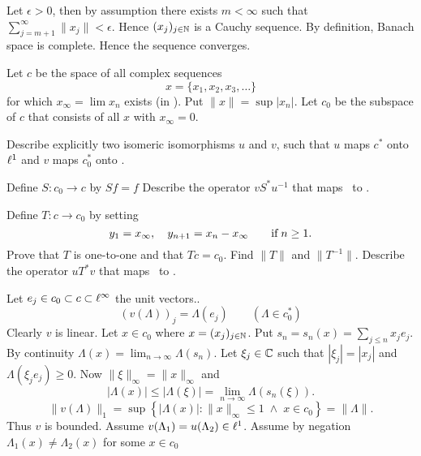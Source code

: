 \begin{enumerate}
Let \(\epsilon>0\), then by assumption there exists \(m < \infty\)
such that \(\sum_{j=m+1}^\infty \|x_j\| < \epsilon\).
Hence \((x_j)_{j\in\mathbb{N}}\) is a Cauchy sequence. By definition,
Banach space is complete. Hence the sequence converges.


\begin{excopy}
Let $c$ be the space of all complex sequences
\begin{equation*}
x = \{x_1,x_2,x_3,\ldots\}
\end{equation*}
for which \(x_\infty = \lim x_n\) exists (in \C).
 Put \(\|x\| = \sup |x_n|\). Let \(c_0\) be the subspace of $c$ that
consists of all $x$ with \(x_\infty = 0\).
\begin{itemize}

Describe explicitly two isomeric isomorphisms $u$ and $v$,
 such that $u$ maps \(c^*\) onto \(\ell^1\)
and $v$ maps \(c_0^*\) onto \ellone.

Define \(S: c_0 \to c\) by \(Sf = f\) Describe the operator
\(vS^*u^{-1}\) that maps \ellone\ to \ellone.

Define \(T: c \to c_0\) by setting
\begin{equation*}
 y_1 = x_\infty,\quad y_{n+1} = x_n - x_\infty \qquad \textnormal{if}\; n \geq 1.
\end{equation*}
Prove that $T$ is one-to-one and that \(Tc = c_0\).
 Find \(\|T\|\) and \(\|T^{-1}\|\). Describe the
operator \(uT^*v\) that maps \ellone\ to \ellone.
\end{itemize}
\end{excopy}

\begin{itemize}

Let \(e_j \in c_0 \subset c \subset \ell^\infty\) the unit vectors..
\begin{equation*}
(v(\Lambda))_j = \Lambda(e_j) \qquad (\Lambda \in c_0^*)
\end{equation*}
Clearly $v$ is linear.
Let \(x\in c_0\) where \(x=(x_j)_{j\in\mathbb{N}}\).
Put \(s_n = s_n(x) = \sum_{j\leq n} x_j e_j\).
By continuity
\(\Lambda(x) = \lim_{n\to\infty}\Lambda(s_n)\).
Let \(\xi_j \in \mathbb{C}\) such that \(|\xi_j| = |x_j|\)
and \(\Lambda(\xi_j e_j) \geq 0\).
Now \(\|\xi\|_\infty = \|x\|_\infty\) and 
\begin{equation*}
|\Lambda(x)| \leq |\Lambda(\xi)|
 = \lim_{n\to\infty} \Lambda(s_n(\xi)).
\end{equation*}
\begin{equation*}
\|v(\Lambda)\|_1
  = \sup\left\{|\Lambda(x)|: \|x\|_\infty\leq 1\;\land\; x\in c_0\right\}
  = \|\Lambda\|.
\end{equation*}
Thus $v$ is bounded.
Assume \(v(\Lambda_1) = u(\Lambda_2) \in \ell^1\).
Assume by negation \(\Lambda_1(x) \neq \Lambda_2(x)\) for some \(x\in c_0\)


\end{itemize}
\end{enumerate}

